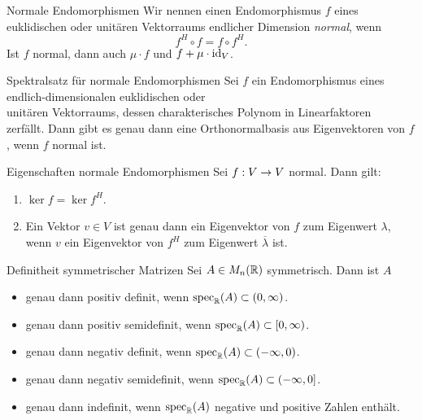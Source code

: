 \documentclass[main.tex]{subfiles}
\begin{document}
\begin{karte}{Normale Endomorphismen}
    Wir nennen einen Endomorphismus 
    \( f \) eines euklidischen oder unitären 
    Vektorraums endlicher Dimension \textit{normal}, 
    wenn 
    \[ f^H \circ f = f \circ f^H. \]
    Ist \( f \) normal, dann auch \( \mu \cdot f \) 
    und \( f + \mu \cdot \operatorname{id}_V \). 
\end{karte}

\begin{karte}{Spektralsatz für normale Endomorphismen}
    Sei \( f \) ein Endomorphismus eines endlich-dimensionalen 
    euklidischen oder \\
    unitären Vektorraums, dessen 
    charakterisches Polynom in Linearfaktoren \\
    zerfällt. 
    Dann gibt es genau dann eine Orthonormalbasis aus 
    Eigenvektoren von \(f\), wenn \(f\) normal ist.
\end{karte}

\begin{karte}{Eigenschaften normale Endomorphismen}
    Sei \(f : V \rightarrow V\) normal. Dann gilt: 
    \begin{enumerate}
        \item \( \ker f = \ker f^H \).
        \item Ein Vektor \(v\in V\) ist genau dann ein 
        Eigenvektor von \(f\) zum Eigenwert \(\lambda\), 
        wenn \(v\) ein Eigenvektor von \( f^H \) zum 
        Eigenwert \( \overline{\lambda} \) ist.
    \end{enumerate}
\end{karte}

\begin{karte}{Definitheit symmetrischer Matrizen}
    Sei \( A\in M_n(\mathbb{R}) \) symmetrisch. Dann ist \(A\)
    \begin{itemize}
        \item genau dann positiv definit, 
        wenn \( \operatorname{spec}_{\mathbb{R}}(A) \subset (0,\infty) \).
        \item genau dann positiv semidefinit, 
        wenn \( \operatorname{spec}_{\mathbb{R}}(A) \subset [0,\infty) \).
        \item genau dann negativ definit, 
        wenn \( \operatorname{spec}_{\mathbb{R}}(A) \subset (-\infty, 0) \).
        \item genau dann negativ semidefinit, 
        wenn \( \operatorname{spec}_{\mathbb{R}}(A) \subset (-\infty, 0] \).
        \item genau dann indefinit, wenn 
        \( \operatorname{spec}_{\mathbb{R}}(A) \) negative und positive Zahlen 
        enthält.
    \end{itemize}
\end{karte}
\end{document}

